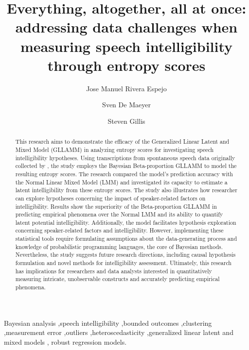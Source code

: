 \documentclass[
  authoryear,
  preprint,
  1p]{elsarticle}
\begin{document}
\begin{frontmatter}
\title{Everything, altogether, all at once: addressing data challenges
when measuring speech intelligibility through entropy scores}
\author[1]{Jose Manuel Rivera Espejo%
%
}
\author[1]{Sven De Maeyer%
%
}
\author[2]{Steven Gillis%
%
}





        
\begin{abstract}
{This research aims to demonstrate the efficacy of the Generalized
Linear Latent and Mixed Model (GLLAMM)
\citep{Rabe_et_al_2004a, Rabe_et_al_2004b, Rabe_et_al_2004c, Skrondal_et_al_2004a}
in analyzing entropy scores for investigating speech intelligibility
hypotheses. Using transcriptions from spontaneous speech data originally
collected by \citet{Boonen_et_al_2021}, the study employs the Bayesian
Beta-proportion GLLAMM to model the resulting entropy scores. The
research compared the model's prediction accuracy with the Normal Linear
Mixed Model (LMM) \citep{Holmes_et_al_2019} and investigated its
capacity to estimate a latent intelligibility from these entropy scores.
The study also illustrates how researcher can explore hypotheses
concerning the impact of speaker-related factors on intelligibility.
Results show the superiority of the Beta-proportion GLLAMM in predicting
empirical phenomena over the Normal LMM and its ability to quantify
latent potential intelligibility. Additionally, the model facilitates
hypothesis exploration concerning speaker-related factors and
intelligibility. However, implementing these statistical tools require
formulating assumptions about the data-generating process and knowledge
of probabilistic programming languages, the core of Bayesian methods.
Nevertheless, the study suggests future research directions, including
causal hypothesis formulation and novel methods for intelligibility
assessment. Ultimately, this research has implications for researchers
and data analysts interested in quantitatively measuring intricate,
unobservable constructs and accurately predicting empirical phenomena.}
\end{abstract}





\begin{keyword}
    Bayesian analysis \sep speech intelligibility \sep bounded
outcomes \sep clustering \sep measurement
error \sep outliers \sep heteroscedasticity \sep generalized linear
latent and mixed models \sep 
    robust regression models.
\end{keyword}
\end{frontmatter}
    
\end{document}
